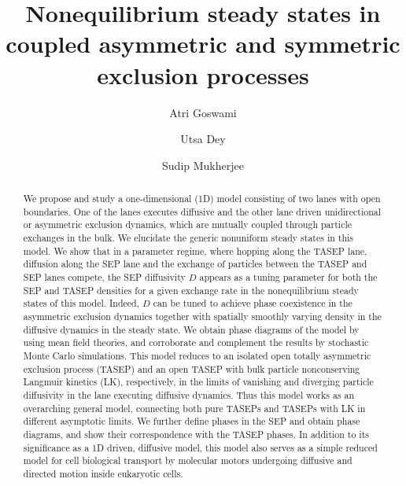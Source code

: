 \documentclass[aps,pre,twocolumn,superscriptaddress,amsmath,amssymb,longbibliography,floatfix,nofootinbib]{revtex4}
\begin{document}
 
\title{Nonequilibrium steady states in coupled asymmetric and symmetric exclusion processes}
\author{Atri Goswami}
\author{Utsa Dey}
\author{Sudip Mukherjee}

\begin{abstract}
We propose and study a one-dimensional (1D) model consisting of two lanes with open boundaries. One of the lanes executes diffusive
and the other lane driven unidirectional or asymmetric exclusion dynamics, which are mutually coupled through particle exchanges in the bulk. We elucidate the generic nonuniform steady states in this model. We show that  in a parameter regime, where hopping along the TASEP lane, diffusion along the SEP lane and the exchange of particles between the TASEP and SEP lanes compete, the SEP diffusivity $D$ appears as a tuning parameter for both the SEP and TASEP densities  for a given exchange rate in the nonequilibrium steady states of this model. Indeed, $D$ can be tuned to achieve phase coexistence in the asymmetric exclusion dynamics together with spatially smoothly varying density in the diffusive dynamics in the steady state. We obtain phase diagrams of the model by using mean field
theories,  and corroborate and complement the results by stochastic Monte Carlo simulations. This model reduces to an isolated open totally asymmetric exclusion process (TASEP) and an open TASEP with bulk particle nonconserving Langmuir kinetics (LK), respectively, in the limits of vanishing and diverging particle diffusivity in the lane executing diffusive dynamics. Thus this model works as an overarching general model, connecting  both pure TASEPs and TASEPs with LK in different asymptotic limits.  %
We further define phases in the SEP and obtain phase diagrams, and show their correspondence with the TASEP phases.
In addition to its significance as a 1D driven, diffusive model, this model also serves as a simple reduced model for cell biological transport
by molecular motors undergoing diffusive and directed motion inside eukaryotic cells.
\end{abstract}
\end{document}
